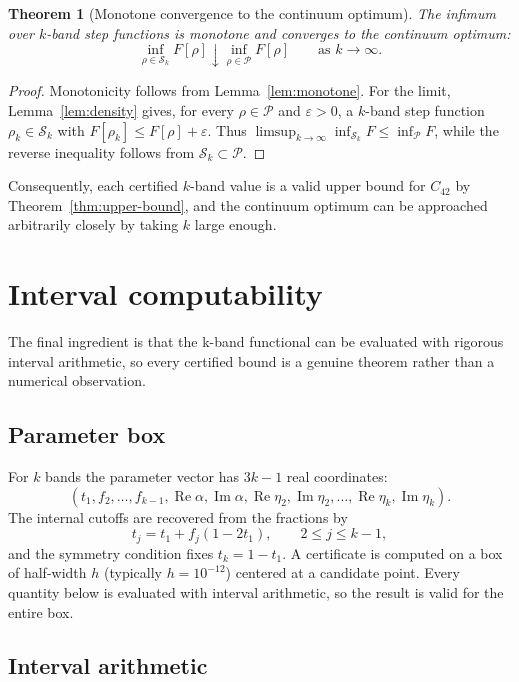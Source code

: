 \documentclass[11pt]{article}
\theoremstyle{plain}
\newtheorem{thm}{Theorem}
\DeclareMathOperator{\Repart}{Re}
\DeclareMathOperator{\Impart}{Im}
\begin{document}
\begin{thm}[Monotone convergence to the continuum optimum]\label{thm:monotone-convergence}
The infimum over $k$-band step functions is monotone and converges to the continuum optimum:
\[
\inf_{\rho\in\mathcal S_k}F[\rho]\downarrow\inf_{\rho\in\mathcal P}F[\rho]
\qquad\text{as }k\to\infty.
\]
\end{thm}
\begin{proof}
Monotonicity follows from Lemma~\ref{lem:monotone}.  For the limit, Lemma~\ref{lem:density} gives, for every $\rho\in\mathcal P$ and $\varepsilon>0$, a $k$-band step function $\rho_k\in\mathcal S_k$ with $F[\rho_k]\le F[\rho]+\varepsilon$.  Thus $\limsup_{k\to\infty}\inf_{\mathcal S_k}F\le\inf_{\mathcal P}F$, while the reverse inequality follows from $\mathcal S_k\subset\mathcal P$.
\end{proof}

Consequently, each certified $k$-band value is a valid upper bound for $C_{42}$ by Theorem~\ref{thm:upper-bound}, and the continuum optimum can be approached arbitrarily closely by taking $k$ large enough.

\section{Interval computability}\label{sec:interval-computability}

The final ingredient is that the k-band functional can be evaluated with rigorous interval arithmetic, so every certified bound is a genuine theorem rather than a numerical observation.

\subsection*{Parameter box}

For $k$ bands the parameter vector has $3k-1$ real coordinates:
\[
(t_1,f_2,\dots,f_{k-1},\Repart\alpha,\Impart\alpha,
\Repart\eta_2,\Impart\eta_2,\dots,\Repart\eta_k,\Impart\eta_k).
\]
The internal cutoffs are recovered from the fractions by
\[
t_j=t_1+f_j(1-2t_1),\qquad 2\le j\le k-1,
\]
and the symmetry condition fixes $t_k=1-t_1$.  A certificate is computed on a box of half-width $h$ (typically $h=10^{-12}$) centered at a candidate point.  Every quantity below is evaluated with interval arithmetic, so the result is valid for the entire box.

\subsection*{Interval arithmetic}
\end{document}
